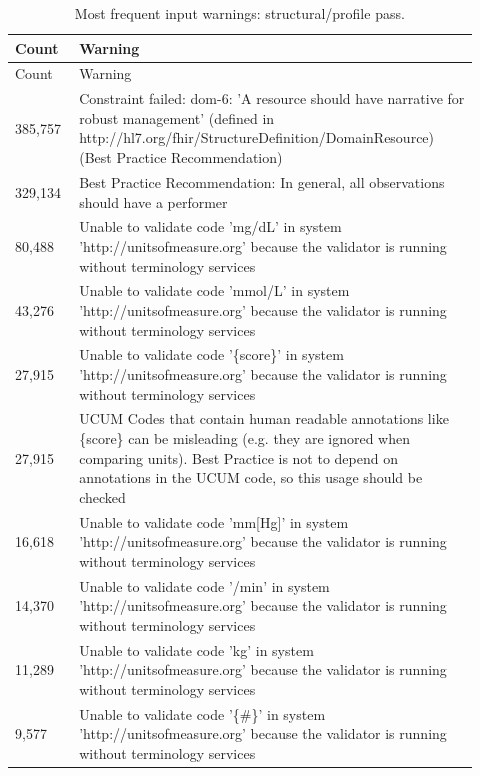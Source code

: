 {\small\setlength{\tabcolsep}{3pt}
\begin{longtable}{p{0.12\linewidth}p{0.8\linewidth}}
\caption{Most frequent input warnings: structural/profile pass.}\label{sup:warningsinputvalidation}\\
\hline
Count & Warning \\ \hline
\endfirsthead
\hline
Count & Warning \\ \hline
\endhead
385,757 & Constraint failed:\allowbreak{} dom-\allowbreak{}6:\allowbreak{} 'A resource should have narrative for robust management' (defined in http:\allowbreak{}/\allowbreak{}/\allowbreak{}hl7.\allowbreak{}org/\allowbreak{}fhir/\allowbreak{}StructureDefinition/\allowbreak{}DomainResource) (Best Practice Recommendation) \\
329,134 & Best Practice Recommendation:\allowbreak{} In general, all observations should have a performer \\
80,488 & Unable to validate code 'mg/\allowbreak{}dL' in system 'http:\allowbreak{}/\allowbreak{}/\allowbreak{}unitsofmeasure.\allowbreak{}org' because the validator is running without terminology services \\
43,276 & Unable to validate code 'mmol/\allowbreak{}L' in system 'http:\allowbreak{}/\allowbreak{}/\allowbreak{}unitsofmeasure.\allowbreak{}org' because the validator is running without terminology services \\
27,915 & Unable to validate code '\{score\}' in system 'http:\allowbreak{}/\allowbreak{}/\allowbreak{}unitsofmeasure.\allowbreak{}org' because the validator is running without terminology services \\
27,915 & UCUM Codes that contain human readable annotations like \{score\} can be misleading (e.\allowbreak{}g.\allowbreak{} they are ignored when comparing units).\allowbreak{} Best Practice is not to depend on annotations in the UCUM code, so this usage should be checked \\
16,618 & Unable to validate code 'mm[Hg]' in system 'http:\allowbreak{}/\allowbreak{}/\allowbreak{}unitsofmeasure.\allowbreak{}org' because the validator is running without terminology services \\
14,370 & Unable to validate code '/\allowbreak{}min' in system 'http:\allowbreak{}/\allowbreak{}/\allowbreak{}unitsofmeasure.\allowbreak{}org' because the validator is running without terminology services \\
11,289 & Unable to validate code 'kg' in system 'http:\allowbreak{}/\allowbreak{}/\allowbreak{}unitsofmeasure.\allowbreak{}org' because the validator is running without terminology services \\
9,577 & Unable to validate code '\{\#\}' in system 'http:\allowbreak{}/\allowbreak{}/\allowbreak{}unitsofmeasure.\allowbreak{}org' because the validator is running without terminology services \\
\hline\end{longtable}}

